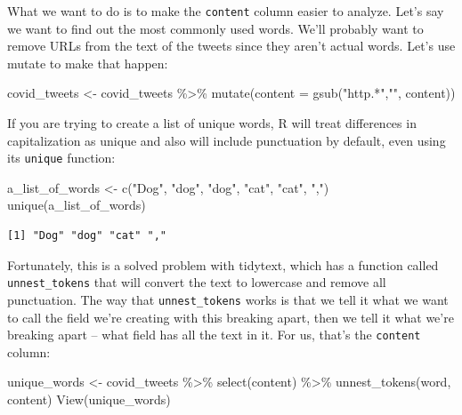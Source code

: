 \documentclass[
  letterpaper,
  DIV=11,
  numbers=noendperiod]{scrreprt}
\newenvironment{Shaded}{\begin{snugshade}}{\end{snugshade}}
\newcommand{\AttributeTok}[1]{\textcolor[rgb]{0.40,0.45,0.13}{#1}}
\newcommand{\FunctionTok}[1]{\textcolor[rgb]{0.28,0.35,0.67}{#1}}
\newcommand{\NormalTok}[1]{\textcolor[rgb]{0.00,0.23,0.31}{#1}}
\newcommand{\OtherTok}[1]{\textcolor[rgb]{0.00,0.23,0.31}{#1}}
\newcommand{\SpecialCharTok}[1]{\textcolor[rgb]{0.37,0.37,0.37}{#1}}
\newcommand{\StringTok}[1]{\textcolor[rgb]{0.13,0.47,0.30}{#1}}
\begin{document}
What we want to do is to make the \texttt{content} column easier to
analyze. Let's say we want to find out the most commonly used words.
We'll probably want to remove URLs from the text of the tweets since
they aren't actual words. Let's use mutate to make that happen:

\begin{Shaded}
\begin{Highlighting}[]
\NormalTok{covid\_tweets }\OtherTok{\textless{}{-}}\NormalTok{ covid\_tweets }\SpecialCharTok{\%\textgreater{}\%}
  \FunctionTok{mutate}\NormalTok{(}\AttributeTok{content =} \FunctionTok{gsub}\NormalTok{(}\StringTok{"http.*"}\NormalTok{,}\StringTok{""}\NormalTok{, content))}
\end{Highlighting}
\end{Shaded}

If you are trying to create a list of unique words, R will treat
differences in capitalization as unique and also will include
punctuation by default, even using its \texttt{unique} function:

\begin{Shaded}
\begin{Highlighting}[]
\NormalTok{a\_list\_of\_words }\OtherTok{\textless{}{-}} \FunctionTok{c}\NormalTok{(}\StringTok{"Dog"}\NormalTok{, }\StringTok{"dog"}\NormalTok{, }\StringTok{"dog"}\NormalTok{, }\StringTok{"cat"}\NormalTok{, }\StringTok{"cat"}\NormalTok{, }\StringTok{","}\NormalTok{)}
\FunctionTok{unique}\NormalTok{(a\_list\_of\_words)}
\end{Highlighting}
\end{Shaded}

\begin{verbatim}
[1] "Dog" "dog" "cat" ","  
\end{verbatim}

Fortunately, this is a solved problem with tidytext, which has a
function called \texttt{unnest\_tokens} that will convert the text to
lowercase and remove all punctuation. The way that
\texttt{unnest\_tokens} works is that we tell it what we want to call
the field we're creating with this breaking apart, then we tell it what
we're breaking apart -- what field has all the text in it. For us,
that's the \texttt{content} column:

\begin{Shaded}
\begin{Highlighting}[]
\NormalTok{unique\_words }\OtherTok{\textless{}{-}}\NormalTok{ covid\_tweets }\SpecialCharTok{\%\textgreater{}\%} \FunctionTok{select}\NormalTok{(content) }\SpecialCharTok{\%\textgreater{}\%}
  \FunctionTok{unnest\_tokens}\NormalTok{(word, content)}
\FunctionTok{View}\NormalTok{(unique\_words)}
\end{Highlighting}
\end{Shaded}
\end{document}

